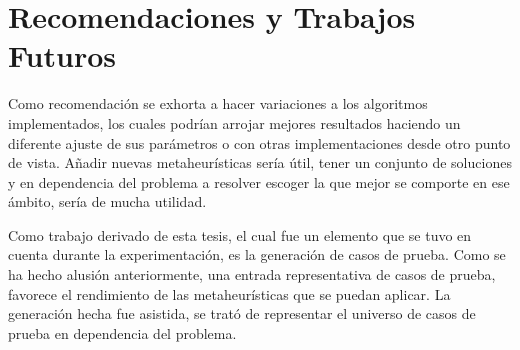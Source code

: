 \documentclass[a4paper,12pt]{book}
\begin{document}
	\section{Recomendaciones y Trabajos Futuros}
	
	Como recomendación se exhorta a hacer variaciones a los algoritmos implementados, los cuales podrían arrojar mejores resultados haciendo un diferente ajuste de sus parámetros o con otras implementaciones desde otro punto de vista. Añadir nuevas metaheurísticas sería útil, tener un conjunto de soluciones y en dependencia del problema a resolver escoger la que mejor se comporte en ese ámbito, sería de mucha utilidad.
	
	Como trabajo derivado de esta tesis, el cual fue un elemento que se tuvo en cuenta durante la experimentación, es la generación de casos de prueba. Como se ha hecho alusión anteriormente, una entrada representativa de casos de prueba, favorece el rendimiento de las metaheurísticas que se puedan aplicar. La generación hecha fue asistida, se trató de representar el universo de casos de prueba en dependencia del problema.
	
	
	 



\end{document}
